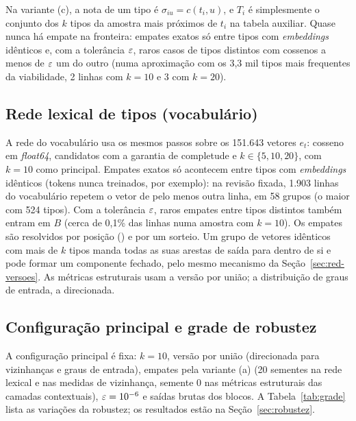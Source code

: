Na variante (c), a nota de um tipo é $\sigma_{iu}=c(t_i,u)$, e $T_i$ é simplesmente o conjunto
dos $k$ tipos da amostra mais próximos de $t_i$ na tabela auxiliar. Quase nunca há empate na
fronteira: empates exatos só entre tipos com \emph{embeddings} idênticos e, com a tolerância
$\varepsilon$, raros casos de tipos distintos com cossenos a menos de $\varepsilon$ um do outro (numa
aproximação com os 3,3 mil tipos mais frequentes da viabilidade, 2 linhas com $k=10$ e 3 com
$k=20$).

\subsection{Rede lexical de tipos (vocabulário)}\label{sec:red-vocab}

A rede do vocabulário usa os mesmos passos sobre os 151.643 vetores $e_t$: cosseno em
\emph{float64}, candidatos com a garantia de completude e $k\in\{5,10,20\}$, com $k=10$ como
principal. Empates exatos só acontecem entre tipos com \emph{embeddings} idênticos (tokens
nunca treinados, por exemplo): na revisão fixada, 1.903 linhas do vocabulário repetem o vetor
de pelo menos outra linha, em 58 grupos (o maior com 524 tipos). Com a tolerância $\varepsilon$, raros
empates entre tipos distintos também entram em $B$ (cerca de 0,1\% das linhas numa amostra com
$k=10$). Os empates são resolvidos por posição () e por um sorteio. Um grupo de
vetores idênticos com mais de $k$ tipos manda todas as suas arestas de saída para dentro de si
e pode formar um componente fechado, pelo mesmo mecanismo da
Seção~\ref{sec:red-versoes}. As métricas estruturais usam a versão por união; a
distribuição de graus de entrada, a direcionada.

\subsection{Configuração principal e grade de robustez}\label{sec:red-robustez}

A configuração principal é fixa: $k=10$, versão por união (direcionada para vizinhanças e graus
de entrada), empates pela variante (a) (20 sementes na rede lexical e nas medidas de
vizinhança, semente 0 nas métricas estruturais das camadas contextuais), $\varepsilon=10^{-6}$ e saídas
brutas dos
blocos. A Tabela~\ref{tab:grade} lista as variações da robustez; os resultados estão na
Seção~\ref{sec:robustez}.


